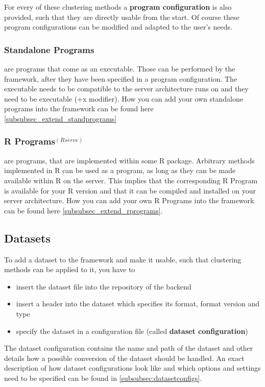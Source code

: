 	For every of these clustering methods a \textbf{program configuration} is also provided, such that they are directly usable from the start. Of course these program configurations can be modified and adapted to the user's needs.
	
	\subsubsection{Standalone Programs}
	are programs that come as an executable. Those can be performed by the framework, after they have been specified in a program configuration. The executable needs to be compatible to the server architecture \clusteval runs on and they need to be executable (+x modifier). How you can add your own standalone programs into the framework can be found here \ref{subsubsec_extend_standprograms}
	\subsubsection{R Programs$^{(Rserve)}$}\label{rprograms} are programs, that are implemented within some R package. Arbitrary methods implemented in R can be used as a program, as long as they can be made available within R on the server. This implies that the corresponding R Program is available for your R version and that it can be compiled and installed on your server architecture. How you can add your own R Programs into the framework can be found here \ref{subsubsec_extend_rprograms}.
	
	\subsection{Datasets}\label{subsec:datasets}
	To add a dataset to the framework and make it usable, such that clustering methods can be applied to it, you have to
	\begin{itemize}		
		\item insert the dataset file into the repository of the backend
		\item insert a header into the dataset which specifies its format, format version and type
		\item specify the dataset in a configuration file (called \textbf{dataset configuration})
\end{itemize}
The dataset configuration contains the name and path of the dataset and other details how a possible conversion of the dataset should be handled. An exact description of how dataset configurations look like and which options and settings need to be specified can be found in \ref{subsubsec:datasetconfigs}.


